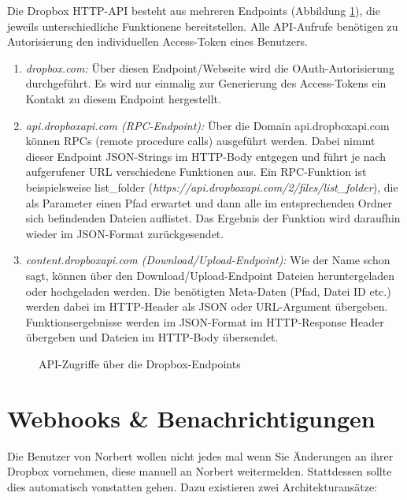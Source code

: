 Die Dropbox HTTP-API besteht aus mehreren Endpoints (Abbildung \ref{04ergebnis:dpendpoints}), die jeweils unterschiedliche Funktionene bereitstellen. Alle API-Aufrufe benötigen zu Autorisierung den individuellen Access-Token eines Benutzers.

\begin{enumerate}
	\item \textit{dropbox.com:} Über diesen Endpoint/Webseite wird die OAuth-Autorisierung durchgeführt. Es wird nur einmalig zur Generierung des Access-Tokens ein Kontakt zu diesem Endpoint hergestellt.
	
	\item \textit{api.dropboxapi.com (RPC-Endpoint):}  Über die Domain api.dropboxapi.com können RPCs (remote procedure calls) ausgeführt werden. Dabei nimmt dieser Endpoint JSON-Strings im HTTP-Body entgegen und führt je nach aufgerufener URL verschiedene Funktionen aus. Ein RPC-Funktion ist beispielsweise list\_{folder} (\textit{https://api.dropboxapi.com/2/files/list\_{folder}}), die als Parameter einen Pfad erwartet und dann alle im entsprechenden Ordner sich
 befindenden Dateien auflistet. Das Ergebnis der Funktion wird daraufhin wieder im JSON-Format zurückgesendet.
 
 	\item \textit{content.dropboxapi.com (Download/Upload-Endpoint):} Wie der Name schon sagt, können über den Download/Upload-Endpoint Dateien heruntergeladen oder hochgeladen werden. Die benötigten Meta-Daten (Pfad, Datei ID etc.) werden dabei im HTTP-Header als JSON oder URL-Argument übergeben. Funktionsergebnisse werden im JSON-Format im HTTP-Response Header übergeben und Dateien im HTTP-Body übersendet.
\end{enumerate}

\begin{figure}[H]
\centering
	\scalebox{0.5}{}
	\caption{API-Zugriffe über die Dropbox-Endpoints}
	\label{04ergebnis:dpendpoints}	
\end{figure}

\section{Webhooks \& Benachrichtigungen}

Die Benutzer von Norbert wollen nicht jedes mal wenn Sie Änderungen an ihrer Dropbox vornehmen, diese manuell an Norbert weitermelden. Stattdessen sollte dies automatisch vonstatten gehen. Dazu existieren zwei Architekturansätze:

